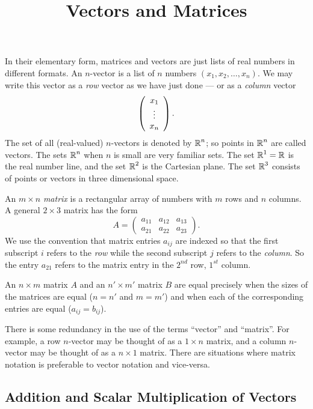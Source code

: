 \documentclass{ximera}
\title{Vectors and Matrices}
\begin{document}
\begin{abstract}
\end{abstract}
\maketitle


\label{S:1.1}

In their elementary form, matrices and vectors are just lists of 
real numbers in different formats.  An $n$-vector is a list of $n$ 
numbers $(x_1,x_2,\ldots,x_n)$.  We may write this vector as a 
{\em row\/} vector as we have just done --- or as a 
{\em column\/} vector
\[
\left(\begin{array}{c} x_1 \\ \vdots \\ x_{n}\end{array}\right).
\]
The set of all (real-valued) $n$-vectors is denoted by $\mbox{$\Bbb{R}$}^n$; 
so points in $\mbox{$\Bbb{R}$}^n$ are called vectors.  The sets $\mbox{$\Bbb{R}$}^n$ when $n$ is small
are very familiar sets.  The set $\mbox{$\Bbb{R}$}^1=\mbox{$\Bbb{R}$}$ is the real number
line, and the set $\mbox{$\Bbb{R}$}^2$ is the Cartesian plane.
The set $\mbox{$\Bbb{R}$}^3$ consists of points or vectors in three dimensional space.

An $m\times n$ {\em matrix\/} is a rectangular array
of numbers with $m$ rows and $n$ columns.  A general $2\times 3$
matrix has the form
\[
A=\left(\begin{array}{ccc} a_{11} & a_{12} & a_{13} \\
     a_{21} & a_{22} & a_{23} \end{array}\right).
\]
We use the convention that matrix entries $a_{ij}$ are indexed
so that the first subscript $i$ refers to the {\em row\/}
 while the second subscript $j$ refers to the {\em
column\/}.  So the entry $a_{21}$ refers to the
matrix entry in the $2^{nd}$ row, $1^{st}$ column.

An $n\times m$ matrix $A$ and an $n'\times m'$ matrix $B$ are equal
precisely when the sizes of the matrices are equal ($n=n'$ and $m=m'$)
and when each of the corresponding entries are equal ($a_{ij}=b_{ij}$).

There is some redundancy in the use of the terms ``vector'' and
``matrix''.  For example, a row $n$-vector may be thought of as a 
$1\times n$ matrix, and a column $n$-vector may be thought of as a 
$n\times 1$ matrix.  There are situations where matrix notation is 
preferable to vector notation and vice-versa.


\subsection*{Addition and Scalar Multiplication of Vectors}
\end{document}
